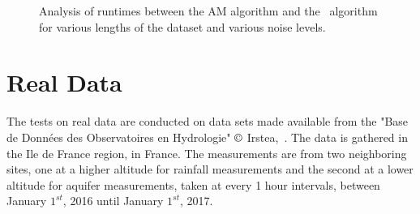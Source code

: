 \documentclass[]{elsarticle} %
\begin{document}
\begin{figure}[H]
    \caption{Analysis of runtimes between the AM algorithm and the~\cite{Z_Hydro_Cirpka2007} algorithm for various lengths of the dataset and various noise levels.}
    \label{fig_runtimes_AM_cirpka}
\end{figure}

\section{Real Data}
\label{sec:real}

The tests on real data are conducted on data sets made available from the "Base de Données des Observatoires en Hydrologie" $\copyright$ Irstea,~\cite{IRSTEA}. The data is gathered in the Ile de France region, in France. The measurements are from two neighboring sites, one at a higher altitude for rainfall measurements and the second at a lower altitude for aquifer measurements, taken at every 1 hour intervals, between January $1^{st}$, 2016 until January $1^{st}$, 2017.
\end{document}
